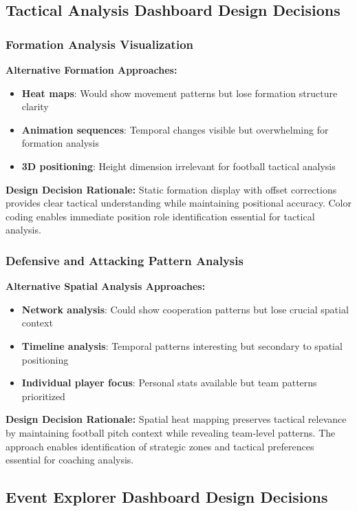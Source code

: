 \documentclass[12pt,a4paper]{article}
\begin{document}
\subsection{Tactical Analysis Dashboard Design Decisions}

\subsubsection{Formation Analysis Visualization}
\textbf{Alternative Formation Approaches:}
\begin{itemize}
    \item \textbf{Heat maps}: Would show movement patterns but lose formation structure clarity
    \item \textbf{Animation sequences}: Temporal changes visible but overwhelming for formation analysis
    \item \textbf{3D positioning}: Height dimension irrelevant for football tactical analysis
\end{itemize}

\textbf{Design Decision Rationale:}
Static formation display with offset corrections provides clear tactical understanding while maintaining positional accuracy. Color coding enables immediate position role identification essential for tactical analysis.

\subsubsection{Defensive and Attacking Pattern Analysis}
\textbf{Alternative Spatial Analysis Approaches:}
\begin{itemize}
    \item \textbf{Network analysis}: Could show cooperation patterns but lose crucial spatial context
    \item \textbf{Timeline analysis}: Temporal patterns interesting but secondary to spatial positioning
    \item \textbf{Individual player focus}: Personal stats available but team patterns prioritized
\end{itemize}

\textbf{Design Decision Rationale:}
Spatial heat mapping preserves tactical relevance by maintaining football pitch context while revealing team-level patterns. The approach enables identification of strategic zones and tactical preferences essential for coaching analysis.

\subsection{Event Explorer Dashboard Design Decisions}
\end{document}
